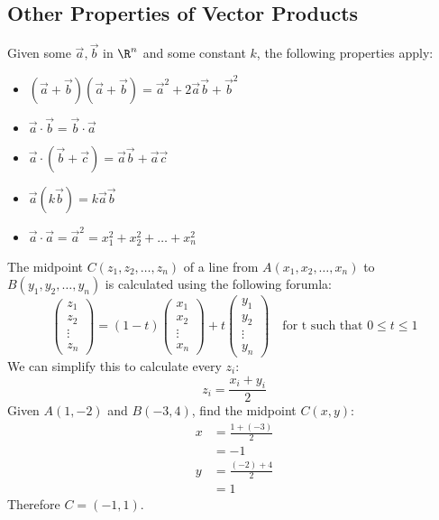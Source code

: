 \documentclass[a4paper]{article}
\begin{document}
  \subsection{Other Properties of Vector Products}
  Given some $\vec{a},\vec{b}$ in $\R^n$ and some constant $k$, the following properties apply:
  \begin{itemize}
    \item $(\vec{a}+\vec{b})(\vec{a}+\vec{b}) = \vec{a}^2+2\vec{a}\vec{b}+\vec{b}^2$
    \item $\vec{a} \cdot \vec{b} = \vec{b} \cdot \vec{a}$
    \item $\vec{a} \cdot (\vec{b}+\vec{c}) = \vec{a}\vec{b} + \vec{a}\vec{c}$
    \item $\vec{a}(k\vec{b}) = k\vec{a}\vec{b}$
    \item $\vec{a} \cdot \vec{a} = \vec{a}^2 = x_1^2 + x_2^2 + \dots + x_n^2$
  \end{itemize}
  The midpoint $C(z_1,z_2,\dots,z_n)$ of a line from $A(x_1,x_2,\dots,x_n)$ to $B(y_1,y_2,\dots,y_n)$ is calculated using the following forumla:
  \[
    \begin{pmatrix}
    z_1 \\ z_2 \\ \vdots \\ z_n
    \end{pmatrix}
    = (1-t)
    \begin{pmatrix}
     x_1 \\ x_2 \\ \vdots \\ x_n 
    \end{pmatrix}
    + t
    \begin{pmatrix}
     y_1 \\ y_2 \\ \vdots \\ y_n 
    \end{pmatrix}
    \quad
    \textrm{for t such that }
    0 \le t \le 1
  \]
  We can simplify this to calculate every $z_i$:
  \[
    z_i = \displaystyle\frac{x_i+y_i}{2}
  \]
  Given $A(1,-2)$ and $B(-3,4)$, find the midpoint $C(x,y)$:
  \begin{equation}
    \begin{split}
      x &= \displaystyle\frac{1+(-3 )}{2} \\
        &= -1\\
      y &= \displaystyle\frac{(-2)+4 }{2} \\
        &= 1
    \end{split}
  \end{equation}
  Therefore $C = (-1,1)$.
\end{document}
